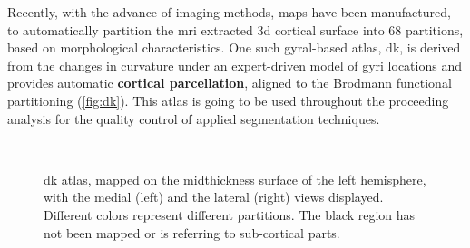  Recently, with the advance of imaging methods, maps have been manufactured, to automatically partition the \ac{mri} extracted \ac{3d} cortical surface into 68 partitions, based on morphological characteristics. One such gyral-based atlas, \ac{dk}, is derived from the changes in curvature under an expert-driven model of gyri locations \cite{Desikan2006} and provides automatic \textbf{cortical parcellation}, aligned to the Brodmann functional partitioning (\autoref{fig:dk}). This atlas is going to be used throughout the proceeding analysis for the quality control of applied segmentation techniques.
 
 \begin{figure}[H]
 	\centering
 	\\
 	\caption[Desikan-Killiany atlas on midthickness surface]{\Acl{dk} atlas, mapped on the midthickness surface of the left hemisphere, with the medial (left) and the lateral (right) views displayed.\cite{Dickie2019} Different colors represent different partitions. The black region has not been mapped or is referring to sub-cortical parts.}
 	\label{fig:dk}
 \end{figure}

 
